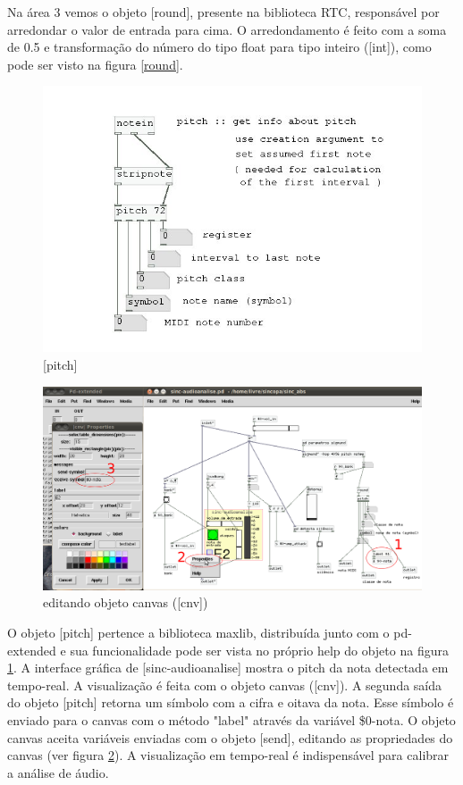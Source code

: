\documentclass{ppgmus}
\begin{document}
Na área 3 vemos o objeto [round], presente na biblioteca RTC, responsável
por arredondar o valor de entrada para cima. O arredondamento é feito com
a soma de 0.5 e transformação do número do tipo float para tipo inteiro ([int]),
como pode ser visto na figura \ref{round}.


\begin{figure}
\includegraphics[scale=.7]{pitch}
\caption{[pitch]}
\label{pitch}
\end{figure}


\begin{figure}
\includegraphics[scale=.5]{canvas-edit}
\caption{editando objeto canvas ([cnv])}
\label{canvas-edit}
\end{figure}


O objeto [pitch] pertence a biblioteca maxlib, distribuída junto com o 
pd-extended e sua funcionalidade pode ser vista no próprio help do objeto na 
figura \ref{pitch}. A interface gráfica de [sinc-audioanalise] mostra o pitch
da nota detectada em tempo-real. A visualização é feita com o objeto canvas ([cnv]).
A segunda saída do objeto [pitch] retorna um símbolo com a cifra e oitava
da nota. Esse símbolo é enviado para o canvas com o método "label" através
da variável \$0-nota. O objeto canvas aceita variáveis enviadas com o objeto [send],
editando as propriedades do canvas (ver figura \ref{canvas-edit}). A visualização em tempo-real
é indispensável para calibrar a análise de áudio.
\end{document}
